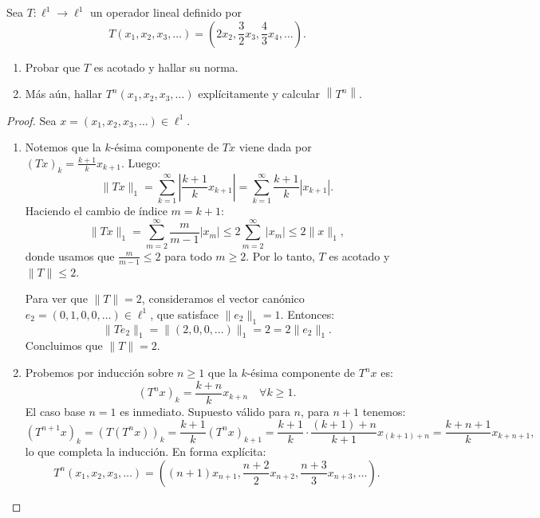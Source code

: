 \documentclass{article}
\theoremstyle{definition}
\newcommand{\norm}[1]{\left\lVert #1 \right\rVert}       %
\newenvironment{ejercicio}[1]{\begin{trivlist}
\item[\hskip \labelsep {\bfseries Ejercicio}\hskip \labelsep {\bfseries #1.}]}{\end{trivlist}}
\begin{document}
\begin{ejercicio}{6}
    Sea \(T:\ell^1\to\ell^1\) un operador lineal definido por
    \[
        T(x_1,x_2,x_3,\dots)=\left(2x_2,\frac32 x_3,\frac43 x_4,\dots\right).
    \]
    \begin{enumerate}
        \item Probar que \(T\) es acotado y hallar su norma.
        \item Más aún, hallar \(T^n(x_1,x_2,x_3,\dots)\) explícitamente y calcular \(\norm{T^n}\).
    \end{enumerate}
\end{ejercicio}
\begin{proof}
    Sea \(x = (x_1,x_2,x_3,\dots) \in \ell^1\).
    \begin{enumerate}
        \item Notemos que la \(k\)-ésima componente de \(Tx\) viene dada por \((Tx)_k = \frac{k+1}{k} x_{k+1}\). Luego:
              \[
                  \|T x\|_1 = \sum_{k=1}^\infty \left| \frac{k+1}{k} x_{k+1} \right| = \sum_{k=1}^\infty \frac{k+1}{k} |x_{k+1}|.
              \]
              Haciendo el cambio de índice \(m = k+1\):
              \[
                  \|T x\|_1 = \sum_{m=2}^\infty \frac{m}{m-1} |x_m| \leq 2 \sum_{m=2}^\infty |x_m| \leq 2 \|x\|_1,
              \]
              donde usamos que \(\frac{m}{m-1} \leq 2\) para todo \(m \ge 2\). Por lo tanto, \(T\) es acotado y \( \|T\| \leq 2 \).

              Para ver que \( \|T\| = 2 \), consideramos el vector canónico \(e_2 = (0,1,0,0,\dots) \in \ell^1\), que satisface \( \|e_2\|_1 = 1 \). Entonces:
              \[
                  \|T e_2\|_1 = \| (2,0,0,\dots) \|_1 = 2 = 2 \| e_2 \|_1.
              \]
              Concluimos que \( \|T\| = 2 \).

        \item Probemos por inducción sobre \(n \ge 1\) que la \(k\)-ésima componente de \(T^n x\) es:
              \[
                  {(T^n x)}_k = \frac{k+n}{k} x_{k+n} \quad \forall k \ge 1.
              \]
              El caso base \(n=1\) es inmediato. Supuesto válido para \(n\), para \(n+1\) tenemos:
              \[
                  {(T^{n+1} x)}_k = (T(T^n x))_k = \frac{k+1}{k} (T^n x)_{k+1} = \frac{k+1}{k} \cdot \frac{(k+1)+n}{k+1} x_{(k+1)+n} = \frac{k+n+1}{k} x_{k+n+1},
              \]
              lo que completa la inducción. En forma explícita:
              \[
                  T^n(x_1,x_2,x_3,\dots) = \left((n+1)x_{n+1}, \frac{n+2}{2}x_{n+2}, \frac{n+3}{3}x_{n+3}, \dots \right).
              \]


\end{enumerate}
\end{proof}
\end{document}
